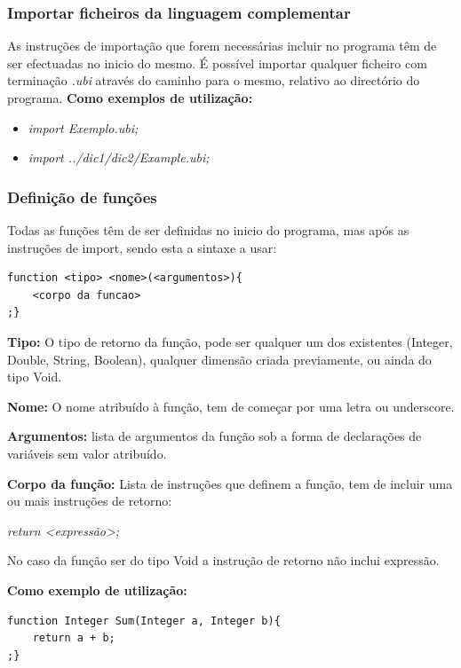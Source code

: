 \documentclass[10pt,portuguese]{article}
\begin{document}
\subsubsection{Importar ficheiros da linguagem complementar}
\par As instruções de importação que forem necessárias incluir no programa têm de ser efectuadas no inicio do mesmo. É possível importar qualquer ficheiro com terminação \emph{.ubi} através do caminho para o mesmo, relativo ao directório do programa.
\textbf{Como exemplos de utilização:}

\begin{itemize}
    \item \textit{import Exemplo.ubi;}
    \item \textit{import ../dic1/dic2/Example.ubi;}
\end{itemize}

\subsubsection{Definição de funções}
\par Todas as funções têm de ser definidas no inicio do programa, mas após as instruções de import, sendo esta a sintaxe a usar:

\begin{lstlisting}[numbers=none]
function <tipo> <nome>(<argumentos>){
    <corpo da funcao>
;}
\end{lstlisting}

\newline
\par \textbf{Tipo:} O tipo de retorno da função, pode ser qualquer um dos existentes (Integer, Double, String, Boolean), qualquer dimensão criada previamente, ou ainda do tipo Void.
\par \textbf{Nome:} O nome atribuído à função, tem de começar por uma letra ou underscore.
\par \textbf{Argumentos:} lista de argumentos da função sob a forma de declarações de variáveis sem valor atribuído.
\par \textbf{Corpo da função:} Lista de instruções que definem a função, tem de incluir uma ou mais instruções de retorno:
\par \textit{return <expressão>;}
\par No caso da função ser do tipo Void a instrução de retorno não inclui expressão.
\newline
\par \textbf{Como exemplo de utilização:}
\begin{lstlisting}[numbers=none]
function Integer Sum(Integer a, Integer b){
    return a + b;
;}
\end{lstlisting}
\end{document}
